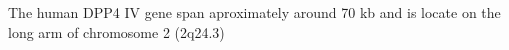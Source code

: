 The human DPP4 IV gene span aproximately around 70 kb and is locate on the long arm of chromosome 2 (2q24.3)
